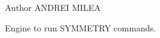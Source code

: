 \begin{DoxyAuthor}{\-Author}
\-A\-N\-D\-R\-E\-I \-M\-I\-L\-E\-A
\end{DoxyAuthor}
\-Engine to run \-S\-Y\-M\-M\-E\-T\-R\-Y commands. 